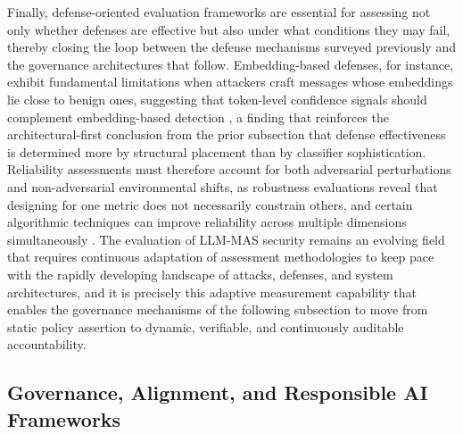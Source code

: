 \documentclass[11pt]{article}
\begin{document}
Finally, defense-oriented evaluation frameworks are essential for assessing not only whether defenses are effective but also under what conditions they may fail, thereby closing the loop between the defense mechanisms surveyed previously and the governance architectures that follow. Embedding-based defenses, for instance, exhibit fundamental limitations when attackers craft messages whose embeddings lie close to benign ones, suggesting that token-level confidence signals should complement embedding-based detection \cite{ref459}, a finding that reinforces the architectural-first conclusion from the prior subsection that defense effectiveness is determined more by structural placement than by classifier sophistication. Reliability assessments must therefore account for both adversarial perturbations and non-adversarial environmental shifts, as robustness evaluations reveal that designing for one metric does not necessarily constrain others, and certain algorithmic techniques can improve reliability across multiple dimensions simultaneously \cite{ref445}. The evaluation of LLM-MAS security remains an evolving field that requires continuous adaptation of assessment methodologies to keep pace with the rapidly developing landscape of attacks, defenses, and system architectures, and it is precisely this adaptive measurement capability that enables the governance mechanisms of the following subsection to move from static policy assertion to dynamic, verifiable, and continuously auditable accountability.

\subsection{Governance, Alignment, and Responsible AI Frameworks}
\end{document}
